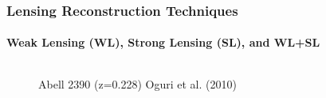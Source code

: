 \documentclass[hyperref={pdfpagelabels=false}]{beamer}
\begin{document}
\begin{frame}
  \frametitle{Lensing Reconstruction Techniques}
  \framesubtitle{Weak Lensing (WL), Strong Lensing (SL), and WL+SL}
  \begin{columns}
    \begin{column}{0.45\textwidth}
      \begin{block}{}
        \begin{figure}
          \caption{Abell 2390 (z=0.228) {\tiny Oguri et al. (2010)}}
        \end{figure}  
      \end{block}
    \end{column}
    \begin{column}{0.55\textwidth}
      \begin{block}{}
        \begin{figure}

\end{figure}
\end{block}
\end{column}
\end{columns}
\end{frame}
\end{document}
